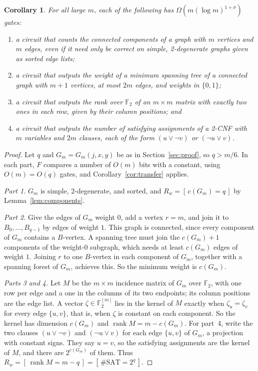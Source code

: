 \documentclass[11pt]{article}
\newtheorem{corollary}[theorem]{Corollary}
\theoremstyle{definition}
\theoremstyle{remark}
\newcommand{\F}{\mathbb{F}}
\newcommand{\ind}[1]{[\,#1\,]}
\begin{document}
\begin{corollary}\label{cor:count}
For all large $m$, each of the following has
$\Omega(m(\log m)^{1+\sigma})$ gates:
\begin{enumerate}
\item a circuit that counts the connected components of a graph with $m$
vertices and $m$ edges, even if it need only be correct on simple,
2-degenerate graphs given as sorted edge lists;
\item a circuit that outputs the weight of a minimum spanning tree of a
connected graph with $m+1$ vertices, at most $2m$ edges, and weights in
$\{0,1\}$;
\item a circuit that outputs the rank over $\F_2$ of an $m\times m$ matrix
with exactly two ones in each row, given by their column positions; and
\item a circuit that outputs the number of satisfying assignments of a
2-CNF with $m$ variables and $2m$ clauses, each of the form $(u\lor\neg
v)$ or $(\neg u\lor v)$.
\end{enumerate}
\end{corollary}
\begin{proof}
Let $q$ and $G_m=G_m(j,x,y)$ be as in Section~\ref{sec:proof}, so $q>m/6$.
In each part, $F$ compares a number of $O(m)$ bits with a constant,
using $O(m)=O(q)$ gates, and Corollary~\ref{cor:transfer} applies.

\emph{Part 1.} $G_m$ is simple, 2-degenerate, and sorted, and
$R_w=\ind{c(G_m)=q}$ by Lemma~\ref{lem:components}.

\emph{Part 2.} Give the edges of $G_m$ weight $0$, add a vertex $r=m$, and
join it to $B_0,\dots,B_{q-1}$ by edges of weight $1$. This graph is
connected, since every component of $G_m$ contains a $B$-vertex. A
spanning tree must join the $c(G_m)+1$ components of the weight-$0$
subgraph, which needs at least $c(G_m)$ edges of weight $1$. Joining $r$
to one $B$-vertex in each component of $G_m$, together with a spanning
forest of $G_m$, achieves this. So the minimum weight is $c(G_m)$.

\emph{Parts 3 and 4.} Let $M$ be the $m\times m$ incidence matrix of
$G_m$ over $\F_2$, with one row per edge and a one in the columns of its
two endpoints; its column positions are the edge list. A vector
$\zeta\in\F_2^{[m]}$ lies in the kernel of $M$ exactly when
$\zeta_u=\zeta_v$ for every edge $\{u,v\}$, that is, when $\zeta$ is
constant on each component. So the kernel has dimension $c(G_m)$ and
$\operatorname{rank}M=m-c(G_m)$. For part~4, write the two clauses
$(u\lor\neg v)$ and $(\neg u\lor v)$ for each edge $\{u,v\}$ of $G_m$, a
projection with constant signs. They say $u=v$, so the satisfying
assignments are the kernel of $M$, and there are $2^{c(G_m)}$ of them.
Thus $R_w=\ind{\operatorname{rank}M=m-q}=\ind{\#\mathrm{SAT}=2^q}$.
\end{proof}
\end{document}
